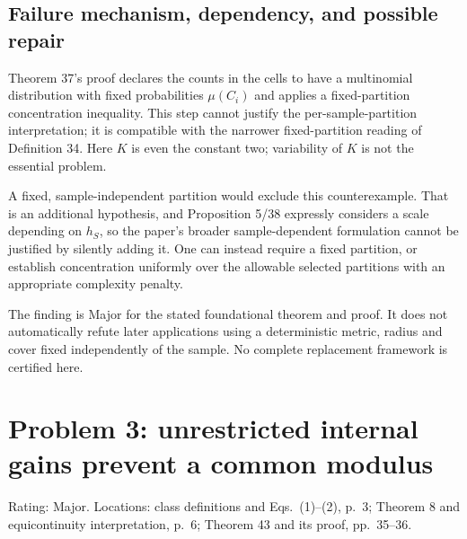\documentclass[10pt]{article}
\begin{document}
\subsection*{Failure mechanism, dependency, and possible repair}
Theorem 37’s proof declares the counts in the cells to have a multinomial distribution with fixed probabilities \(\mu(C_i)\) and applies a fixed-partition concentration inequality. This step cannot justify the per-sample-partition interpretation; it is compatible with the narrower fixed-partition reading of Definition 34. Here \(K\) is even the constant two; variability of \(K\) is not the essential problem.\par
A fixed, sample-independent partition would exclude this counterexample. That is an additional hypothesis, and Proposition 5/38 expressly considers a scale depending on \(h_S\), so the paper’s broader sample-dependent formulation cannot be justified by silently adding it. One can instead require a fixed partition, or establish concentration uniformly over the allowable selected partitions with an appropriate complexity penalty.\par
The finding is Major for the stated foundational theorem and proof. It does not automatically refute later applications using a deterministic metric, radius and cover fixed independently of the sample. No complete replacement framework is certified here.\par
\section*{Problem 3: unrestricted internal gains prevent a common modulus}
Rating: Major. Locations: class definitions and Eqs. (1)–(2), p. 3; Theorem 8 and equicontinuity interpretation, p. 6; Theorem 43 and its proof, pp. 35–36.\par
\end{document}
